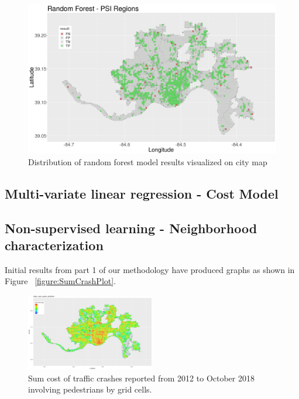 \documentclass{llncs}
\begin{document}
\FloatBarrier
\begin{figure}
 	\includegraphics[width=\textwidth, height=\textheight, keepaspectratio]{RFBinaryResultsMap.png}
 	\caption{Distribution of random forest model results visualized on city map}
	\label{figure : rfbinarymap}
\end{figure}
\FloatBarrier

\subsection{Multi-variate linear regression - Cost Model}

\subsection{Non-supervised learning - Neighborhood characterization}

Initial results from part 1 of our methodology have produced graphs as shown in Figure ~\ref{figure:SumCrashPlot}. \newline
\FloatBarrier
\begin{figure}
 	\includegraphics[width=0.5\textwidth, height=0.5\textheight, keepaspectratio]{trafficcrashreports20180918nonpedestriansumcostmapped2grid.png}
 	\caption{Sum cost of traffic crashes reported from 2012 to October 2018 involving pedestrians by grid cells.}
	\label{figure:SumCrashPlotxxx}
\end{figure}
\FloatBarrier
%
\end{document}

